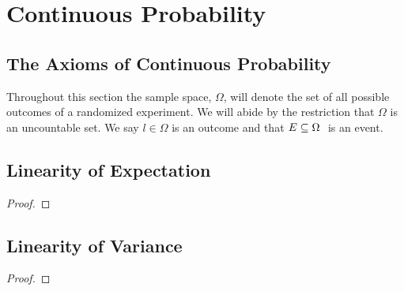 

\chapter{Continuous Probability}
    \section{The Axioms of Continuous Probability}
        \begin{definition}
            Throughout this section the sample space, $\Omega$, will denote the set of
            all possible outcomes of a randomized experiment. We will abide by the restriction
            that $\Omega$ is an uncountable set. We say $l \in \Omega$ is an outcome and that
            $E \subseteq \Omega \ $ is an event.
        \end{definition}
        \begin{axiom}
        \end{axiom}
    \section{Linearity of Expectation}
        \begin{definition}
        \end{definition}
        \begin{definition}
        \end{definition}
        \begin{theorem}
        \end{theorem}
        \begin{proof}
        \end{proof}
    \section{Linearity of Variance}
        \begin{definition}
        \end{definition}
        \begin{theorem}
        \end{theorem}
        \begin{proof}
        \end{proof}
